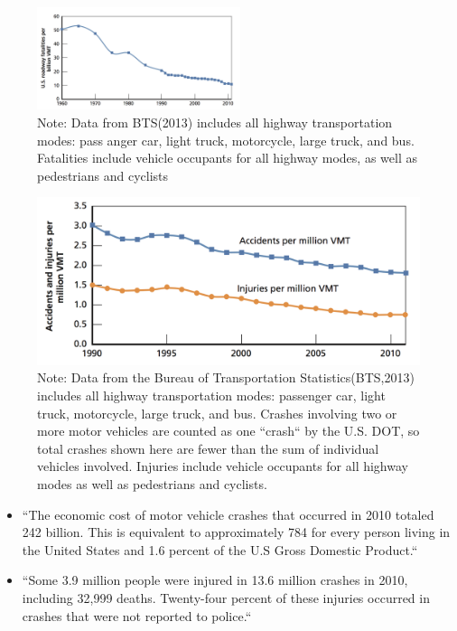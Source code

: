 \documentclass{acm_proc_article-sp}
\begin{document}
 \begin{figure}[!ht]
  \centering
      \includegraphics[width=1.0\columnwidth, height = 3.0cm]{images/picture5.png}
  \caption{Note: Data from BTS(2013) includes all highway transportation modes: pass anger car, light truck, motorcycle, large truck, and bus. Fatalities include vehicle occupants for all highway modes, as well as pedestrians and cyclists}\label{fig:NHTSAaccidentreport}
\end{figure}

 \begin{figure}[!ht]
  \centering
      \includegraphics[width=1.0\columnwidth, height= 3.0 cm]{images/picture6.png}
  \caption{Note: Data from the Bureau of Transportation Statistics(BTS,2013) includes all highway transportation modes: passenger car, light truck, motorcycle, large truck, and bus. Crashes involving two or more motor vehicles are counted as one ``crash`` by the U.S. DOT, so total crashes shown  here are fewer than the sum of individual vehicles involved. Injuries include vehicle occupants for all highway modes as well as pedestrians and cyclists.}\label{fig:NHTSAaccidentreport2}
\end{figure}

\begin{itemize}

\item ``The economic cost of motor vehicle crashes that occurred in 2010 totaled 242 billion. This is equivalent to approximately 784 for every person living in the United States and 1.6 percent of the U.S Gross Domestic Product.``\cite{lawrance}

\item ``Some 3.9 million people were injured in 13.6 million crashes in 2010, including 32,999 deaths. Twenty-four percent of these injuries occurred in crashes that were not reported to police.``\cite{lawrance}

\end{itemize}
\end{document}
